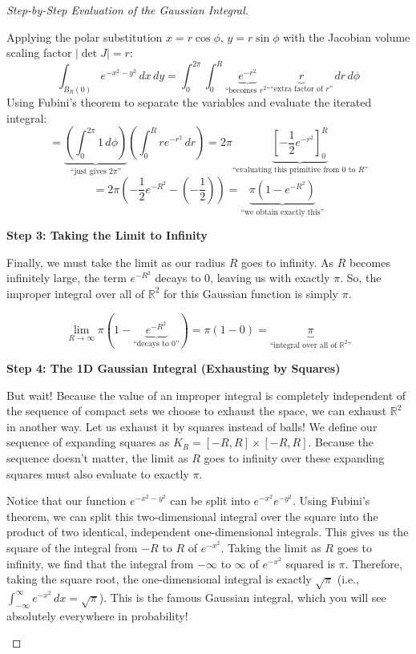 \begin{proof}[Step-by-Step Evaluation of the Gaussian Integral]
\begin{math-stroke}
Applying the polar substitution $x = r\cos\phi$, $y = r\sin\phi$ with the Jacobian volume scaling factor $|\det J| = r$:
\[
\int_{B_R(0)} e^{-x^2-y^2} \, dx \, dy = \int_0^{2\pi} \int_0^R \underbrace{e^{-r^2}}_{\text{``becomes } r^2 \text{''}} \underbrace{r}_{\text{``extra factor of } r \text{''}} \, dr \, d\phi
\]
Using Fubini's theorem to separate the variables and evaluate the iterated integral:
\[
= \underbrace{\left( \int_0^{2\pi} 1 \, d\phi \right)}_{\text{``just gives } 2\pi \text{''}} \left( \int_0^R r e^{-r^2} \, dr \right) = 2\pi \underbrace{\left[ -\frac{1}{2} e^{-r^2} \right]_0^R}_{\text{``evaluating this primitive from } 0 \text{ to } R \text{''}} 
\]
\[
= 2\pi \left( -\frac{1}{2} e^{-R^2} - \left(-\frac{1}{2}\right) \right) = \underbrace{\pi (1 - e^{-R^2})}_{\text{``we obtain exactly this''}}
\]
\end{math-stroke}

\textbf{Step 3: Taking the Limit to Infinity}
\begin{spoken-clean}[24:00 - 25:00]
Finally, we must take the limit as our radius $R$ goes to infinity. As $R$ becomes infinitely large, the term $e^{-R^2}$ decays to $0$, leaving us with exactly $\pi$. So, the improper integral over all of $\mathbb{R}^2$ for this Gaussian function is simply $\pi$.
\end{spoken-clean}

\begin{math-stroke}
\[
\lim_{R \to \infty} \pi (1 - \underbrace{e^{-R^2}}_{\text{``decays to } 0 \text{''}}) = \pi (1 - 0) = \underbrace{\pi}_{\text{``integral over all of } \mathbb{R}^2 \text{''}}
\]
\end{math-stroke}

\textbf{Step 4: The 1D Gaussian Integral (Exhausting by Squares)}
\begin{spoken-clean}[25:00 - 29:00]
But wait! Because the value of an improper integral is completely independent of the sequence of compact sets we choose to exhaust the space, we can exhaust $\mathbb{R}^2$ in another way. Let us exhaust it by squares instead of balls! We define our sequence of expanding squares as $K_R = [-R, R] \times [-R, R]$. Because the sequence doesn't matter, the limit as $R$ goes to infinity over these expanding squares must also evaluate to exactly $\pi$. 

Notice that our function $e^{-x^2 - y^2}$ can be split into $e^{-x^2} e^{-y^2}$. Using Fubini's theorem, we can split this two-dimensional integral over the square into the product of two identical, independent one-dimensional integrals. This gives us the square of the integral from $-R$ to $R$ of $e^{-x^2}$. Taking the limit as $R$ goes to infinity, we find that the integral from $-\infty$ to $\infty$ of $e^{-x^2}$ squared is $\pi$. Therefore, taking the square root, the one-dimensional integral is exactly $\sqrt{\pi}$ (i.e., $\int_{-\infty}^\infty e^{-x^2} \, dx = \sqrt{\pi}$). This is the famous Gaussian integral, which you will see absolutely everywhere in probability!
\end{spoken-clean}


\end{proof}
